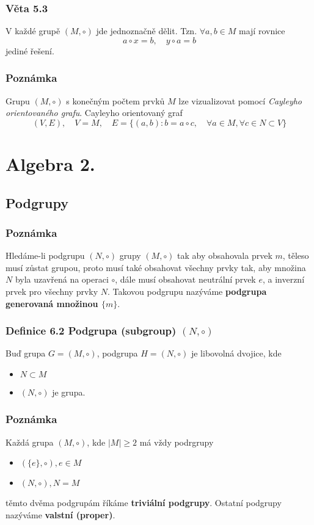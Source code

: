 \documentclass[12pt, letterpaper]{article}
\begin{document}
\subsubsection*{Věta 5.3}
V každé grupě $(M, \circ)$ jde jednoznačně dělit.
 Tzn. $\forall a,b \in M$ mají rovnice \[a \circ x = b, \quad y \circ a = b\] jediné řešení.

\subsubsection*{Poznámka}
Grupu $(M, \circ)$ s konečným počtem prvků $M$ lze vizualizovat pomocí \textit{Cayleyho orientovaného grafu}.
Cayleyho orientovaný graf \[(V,E), \quad V=M, \quad E=\{(a,b): b=a \circ c, \quad \forall a \in M, \forall c \in N \subset V\}\]

\section{Algebra 2.}

\subsection{Podgrupy}

\subsubsection*{Poznámka}
Hledáme-li podgrupu $(N, \circ)$ grupy $(M, \circ)$ tak aby obsahovala prvek $m$,
těleso musí zůstat grupou, proto musí také obsahovat všechny prvky tak, aby množina $N$ byla uzavřená na operaci $\circ$,
dále musí obsahovat neutrální prvek $e$, a inverzní prvek pro všechny prvky $N$.
Takovou podgrupu nazýváme \textbf{podgrupa generovaná množinou $\{m\}$}.

\subsubsection*{Definice 6.2 Podgrupa (subgroup) $(N, \circ)$}
Buď grupa $G = (M, \circ)$, podgrupa $H = (N, \circ)$ je libovolná dvojice, kde
\begin{itemize}
    \item $N \subset M$
    \item $(N, \circ)$ je grupa.
\end{itemize}

\subsubsection*{Poznámka}
Každá grupa $(M, \circ)$, kde $|M| \geq 2$ má vždy podrgrupy
\begin{itemize}
    \item $(\{e\}, \circ), e \in M$
    \item $(N, \circ), N = M$
\end{itemize}
těmto dvěma podgrupám říkáme \textbf{triviální podgrupy}. Ostatní podgrupy nazýváme \textbf{valstní (proper)}.
\end{document}
